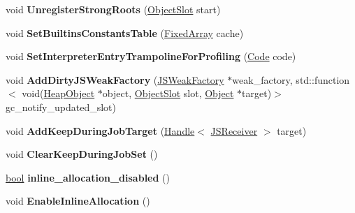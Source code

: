 \begin{DoxyCompactItemize}
void {\bfseries Unregister\+Strong\+Roots} (\mbox{\hyperlink{classv8_1_1internal_1_1ObjectSlot}{Object\+Slot}} start)
\item 
\mbox{\label{classv8_1_1internal_1_1Heap_a1014238054b2997c458890f72955ca7b}} 
void {\bfseries Set\+Builtins\+Constants\+Table} (\mbox{\hyperlink{classv8_1_1internal_1_1FixedArray}{Fixed\+Array}} cache)
\item 
\mbox{\label{classv8_1_1internal_1_1Heap_af5b5e925995a8fc103d09b15363c8869}} 
void {\bfseries Set\+Interpreter\+Entry\+Trampoline\+For\+Profiling} (\mbox{\hyperlink{classv8_1_1internal_1_1Code}{Code}} code)
\item 
\mbox{\label{classv8_1_1internal_1_1Heap_a0dd37007fa3ab5f3071cc30531780b83}} 
void {\bfseries Add\+Dirty\+J\+S\+Weak\+Factory} (\mbox{\hyperlink{classv8_1_1internal_1_1JSWeakFactory}{J\+S\+Weak\+Factory}} $\ast$weak\+\_\+factory, std\+::function$<$ void(\mbox{\hyperlink{classv8_1_1internal_1_1HeapObject}{Heap\+Object}} $\ast$object, \mbox{\hyperlink{classv8_1_1internal_1_1ObjectSlot}{Object\+Slot}} slot, \mbox{\hyperlink{classv8_1_1internal_1_1Object}{Object}} $\ast$target)$>$ gc\+\_\+notify\+\_\+updated\+\_\+slot)
\item 
\mbox{\label{classv8_1_1internal_1_1Heap_a348401e506495e14932e637e5efacd4c}} 
void {\bfseries Add\+Keep\+During\+Job\+Target} (\mbox{\hyperlink{classv8_1_1internal_1_1Handle}{Handle}}$<$ \mbox{\hyperlink{classv8_1_1internal_1_1JSReceiver}{J\+S\+Receiver}} $>$ target)
\item 
\mbox{\label{classv8_1_1internal_1_1Heap_a2c32594609670a0ec7cb9beda111b0c3}} 
void {\bfseries Clear\+Keep\+During\+Job\+Set} ()
\item 
\mbox{\label{classv8_1_1internal_1_1Heap_a5ab14424532c00f1480d186cca9cdbff}} 
\mbox{\hyperlink{classbool}{bool}} {\bfseries inline\+\_\+allocation\+\_\+disabled} ()
\item 
\mbox{\label{classv8_1_1internal_1_1Heap_ab1d6861599cbde5ad3aae965b6a55b3a}} 
void {\bfseries Enable\+Inline\+Allocation} ()
\item 

\end{DoxyCompactItemize}
